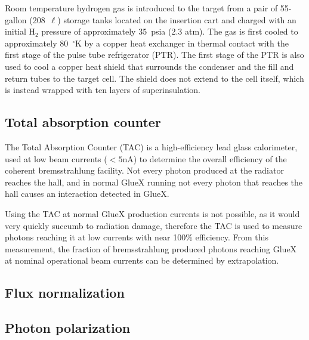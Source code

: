 Room temperature hydrogen gas is introduced to the target from a pair
of 55-gallon (208~$\ell$) storage tanks located on the insertion cart
and charged with an initial H$_2$ pressure of approximately 35~psia (2.3
atm).  The gas is first cooled to approximately 80~$^\circ$K by a copper heat
exchanger in thermal contact with the first stage of the pulse tube
refrigerator (PTR).  The first stage of the PTR is also used to cool a
copper heat shield that surrounds the condenser and the fill and
return tubes to the target cell.  The shield does not extend to the
cell itself, which is instead wrapped with ten layers of
superinsulation.





\subsection{Total absorption counter \label{sec:tac}}
The Total Absorption Counter (TAC) is a high-efficiency lead glass calorimeter, used at low beam currents ($<5$nA) to determine the overall efficiency of the coherent bremsstrahlung facility.
Not every photon produced at the radiator reaches the hall, and in normal GlueX running not every photon that reaches the hall causes an interaction detected in GlueX.

Using the TAC at normal GlueX production currents is not possible, as it would very quickly succumb to radiation damage, therefore the TAC is used to measure photons reaching it at low currents with near 100\% efficiency.
From this measurement, the fraction of bremsstrahlung produced photons reaching GlueX at nominal operational beam currents can be determined by extrapolation.

\subsection{Flux normalization \label{sec:fluxnorm}}
\subsection{Photon polarization \label{sec:polarization}}